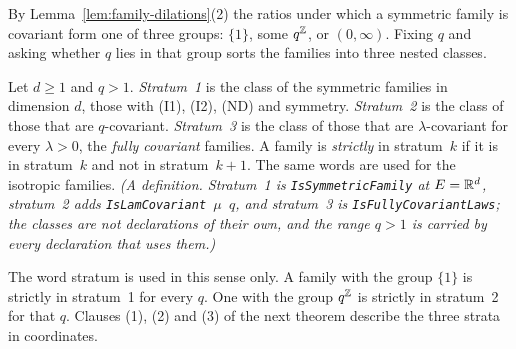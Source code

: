 By Lemma~\ref{lem:family-dilations}(2) the ratios under which a symmetric family is covariant form
one of three groups: $\{1\}$, some $q^{\mathbb{Z}}$, or $(0,\infty)$. Fixing $q$ and asking whether $q$
lies in that group sorts the families into three nested classes.

\begin{definition}
\label{def:strata}
\leanok
{}
Let $d \ge 1$ and $q > 1$. \emph{Stratum~1} is the class of the symmetric families in dimension
$d$, those with (I1), (I2), (ND) and symmetry. \emph{Stratum~2} is the class of those that are
$q$-covariant. \emph{Stratum~3} is the class of those that are $\lambda$-covariant for every
$\lambda > 0$, the \emph{fully covariant} families. A family is \emph{strictly} in stratum~$k$ if it
is in stratum~$k$ and not in stratum~$k + 1$. The same words are used for the isotropic families.
\statusT\quad\emph{(A definition. Stratum~1 is \texttt{IsSymmetricFamily} at $E = \mathbb{R}^d$,
stratum~2 adds \texttt{IsLamCovariant $\mu$ $q$}, and stratum~3 is \texttt{IsFullyCovariantLaws};
the classes are not declarations of their own, and the range $q > 1$ is carried by every
declaration that uses them.)}
\end{definition}

The word stratum is used in this sense only. A family with the group $\{1\}$ is strictly in
stratum~1 for every $q$. One with the group $q^{\mathbb{Z}}$ is strictly in stratum~2 for that $q$.
Clauses (1), (2) and (3) of the next theorem describe the three strata in \Levy{} coordinates.

